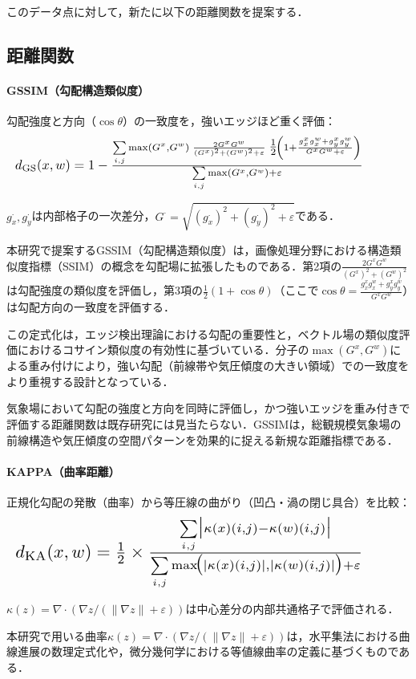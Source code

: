 \documentclass{jarticle}
\theoremstyle{definition}
\newcommand{\halfeq}[2][0.90\linewidth]{%
  \begin{equation}
    \makebox[\linewidth][l]{\resizebox{#1}{!}{\ensuremath{#2}}}%
  \end{equation}
}
\begin{document}
このデータ点に対して，新たに以下の距離関数を提案する．

\subsection{距離関数}
\paragraph{GSSIM（勾配構造類似度）}
勾配強度と方向（$\cos\theta$）の一致度を，強いエッジほど重く評価：
\halfeq{%
d_{\mathrm{GS}}(x,w)=1-
\frac{\sum\limits_{i,j} \max(G^x,G^w)\;
\frac{2G^xG^w}{(G^x)^2+(G^w)^2+\varepsilon}\;
\tfrac{1}{2}\!\left(1+\frac{g_x^x g_x^w+g_y^x g_y^w}{G^x G^w+\varepsilon}\right)
}{\sum\limits_{i,j}\max(G^x,G^w)+\varepsilon}%
}
$g_x^\cdot,g_y^\cdot$は内部格子の一次差分，$G^\cdot=\sqrt{(g_x^\cdot)^2+(g_y^\cdot)^2+\varepsilon}$である．

本研究で提案するGSSIM（勾配構造類似度）は，画像処理分野における構造類似度指標（SSIM）の概念を勾配場に拡張したものである．第2項の$\frac{2G^xG^w}{(G^x)^2+(G^w)^2}$は勾配強度の類似度を評価し，第3項の$\frac{1}{2}(1+\cos\theta)$（ここで$\cos\theta = \frac{g_x^x g_x^w+g_y^x g_y^w}{G^x G^w}$）は勾配方向の一致度を評価する．

この定式化は，エッジ検出理論\cite{canny1986computational,marr1980theory}における勾配の重要性と，ベクトル場の類似度評価におけるコサイン類似度の有効性に基づいている．分子の$\max(G^x,G^w)$による重み付けにより，強い勾配（前線帯や気圧傾度の大きい領域）での一致度をより重視する設計となっている．

気象場において勾配の強度と方向を同時に評価し，かつ強いエッジを重み付きで評価する距離関数は既存研究には見当たらない．GSSIMは，総観規模気象場の前線構造や気圧傾度の空間パターンを効果的に捉える新規な距離指標である．

\paragraph{KAPPA（曲率距離）}
正規化勾配の発散（曲率）から等圧線の曲がり（凹凸・渦の閉じ具合）を比較：
\halfeq{%
d_{\mathrm{KA}}(x,w)=\tfrac{1}{2}\times
\frac{\sum\limits_{i,j}\bigl|\kappa(x)(i,j)-\kappa(w)(i,j)\bigr|}
{\sum\limits_{i,j}\max\!\bigl(|\kappa(x)(i,j)|,|\kappa(w)(i,j)|\bigr)+\varepsilon}%
}
$\kappa(z)=\nabla\cdot\left(\nabla z/(\|\nabla z\|+\varepsilon)\right)$は中心差分の内部共通格子で評価される．

本研究で用いる曲率$\kappa(z)=\nabla\cdot(\nabla z/(\|\nabla z\|+\varepsilon))$は，水平集法における曲線進展の数理定式化\cite{osher1988fronts}や，微分幾何学における等値線曲率の定義\cite{docarmo1976differential}に基づくものである．
\end{document}
